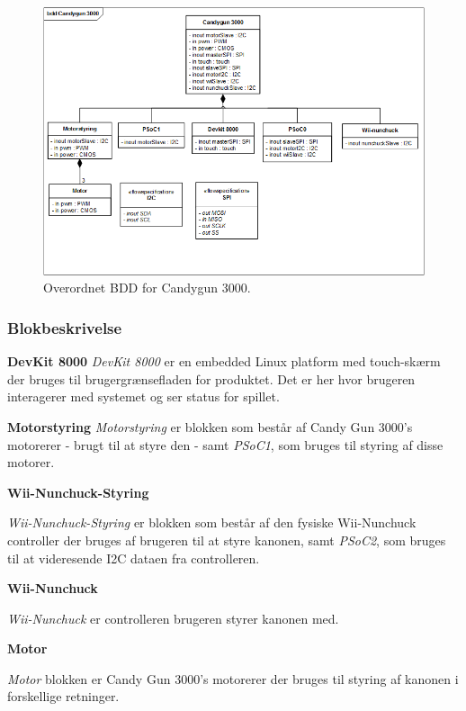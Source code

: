 \begin{figure}[H]
	\centering
	\includegraphics[width= \textwidth]{Systemarkitektur/images/BDD_overordnet.png}
	\caption{Overordnet BDD for Candygun 3000.}
	\label{fig:BDD}
\end{figure}


\subsubsection{Blokbeskrivelse}
\textbf{DevKit 8000}
\newline
\textit{DevKit 8000} er en embedded Linux platform med touch-skærm der bruges til brugergrænsefladen for produktet. Det er her hvor brugeren interagerer med systemet og ser status for spillet.

\textbf{Motorstyring}
\newline
\textit{Motorstyring} er blokken som består af Candy Gun 3000's motorerer - brugt til at styre den - samt \textit{PSoC1}, som bruges til styring af disse motorer.

\textbf{Wii-Nunchuck-Styring}

\textit{Wii-Nunchuck-Styring} er blokken som består af den fysiske Wii-Nunchuck controller der bruges af brugeren til at styre kanonen, samt \textit{PSoC2}, som bruges til at videresende I2C dataen fra controlleren.

\textbf{Wii-Nunchuck}

\textit{Wii-Nunchuck} er controlleren brugeren styrer kanonen med.

\textbf{Motor}

\textit{Motor} blokken er Candy Gun 3000's motorerer der bruges til styring af kanonen i forskellige retninger.

